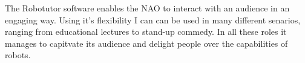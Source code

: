 The Robotutor software enables the NAO to interact with an audience in an engaging way. Using it's flexibility I can can be used in many different senarios, ranging from educational lectures to stand-up commedy. In all these roles it manages to capitvate its audience and delight people over the capabilities of robots.